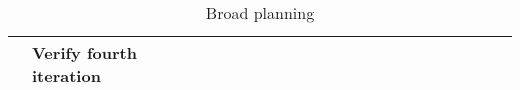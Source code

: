 \begin{table}[ht!]
\begin{tabular}{lp{2.5in}|llllllllllllllllllll|}
    \multicolumn{1}{|l|}{\cellcolor[HTML]{00E2FF}\textbf{}}                & \cellcolor[HTML]{00E2FF}\textbf{Verify fourth iteration}                   & \multicolumn{1}{l|}{}                                   & \multicolumn{1}{l|}{}                                   & \multicolumn{1}{l|}{}                                   & \multicolumn{1}{l|}{}                                   & \multicolumn{1}{l|}{}                                   & \multicolumn{1}{l|}{}                                   & \multicolumn{1}{l|}{}                                   & \multicolumn{1}{l|}{}                                   & \multicolumn{1}{l|}{}                                   & \multicolumn{1}{l|}{}                                    & \multicolumn{1}{l|}{}                                    & \multicolumn{1}{l|}{}                                    & \multicolumn{1}{l|}{}                                    & \multicolumn{1}{l|}{}                                    & \multicolumn{1}{l|}{}                                    & \multicolumn{1}{l|}{}                                    & \multicolumn{1}{l|}{\cellcolor[HTML]{F8A102}}            & \multicolumn{1}{l|}{}                                    & \multicolumn{1}{l|}{}                                    &             \\ \hline
    \end{tabular}
    \label{tab:broad_planning}
    \caption{Broad planning}
    \end{table}